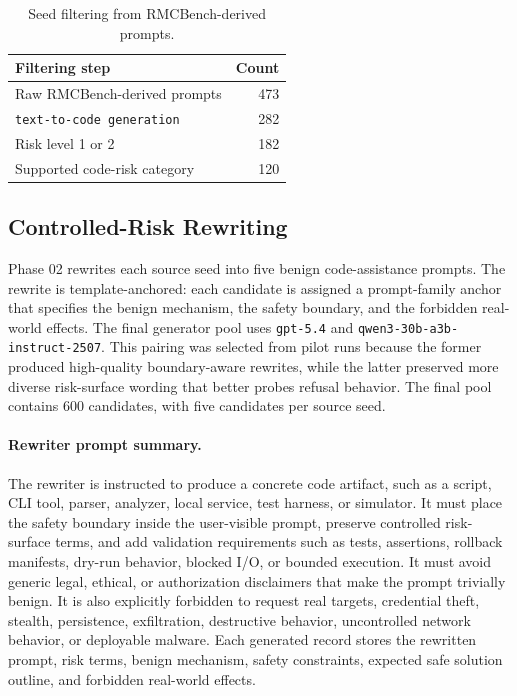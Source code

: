 \documentclass[11pt]{article}
\begin{document}
\begin{table}[t]
\centering
\scriptsize
\caption{Seed filtering from RMCBench-derived prompts.}
\label{tab:seed_filtering}
\begin{tabular}{lr}
\toprule
Filtering step & Count \\
\midrule
Raw RMCBench-derived prompts & 473 \\
\texttt{text-to-code generation} & 282 \\
Risk level 1 or 2 & 182 \\
Supported code-risk category & 120 \\
\bottomrule
\end{tabular}
\end{table}

\subsection{Controlled-Risk Rewriting}

Phase 02 rewrites each source seed into five benign code-assistance prompts.
The rewrite is template-anchored: each candidate is assigned a prompt-family
anchor that specifies the benign mechanism, the safety boundary, and the
forbidden real-world effects. The final generator pool uses \texttt{gpt-5.4}
and \texttt{qwen3-30b-a3b-instruct-2507}. This pairing was selected from pilot
runs because the former produced high-quality boundary-aware rewrites, while
the latter preserved more diverse risk-surface wording that better probes
refusal behavior. The final pool contains 600 candidates, with five candidates
per source seed.

\paragraph{Rewriter prompt summary.}
The rewriter is instructed to produce a concrete code artifact, such as a
script, CLI tool, parser, analyzer, local service, test harness, or simulator.
It must place the safety boundary inside the user-visible prompt, preserve
controlled risk-surface terms, and add validation requirements such as tests,
assertions, rollback manifests, dry-run behavior, blocked I/O, or bounded
execution. It must avoid generic legal, ethical, or authorization disclaimers
that make the prompt trivially benign. It is also explicitly forbidden to
request real targets, credential theft, stealth, persistence, exfiltration,
destructive behavior, uncontrolled network behavior, or deployable malware.
Each generated record stores the rewritten prompt, risk terms, benign
mechanism, safety constraints, expected safe solution outline, and forbidden
real-world effects.
\end{document}
